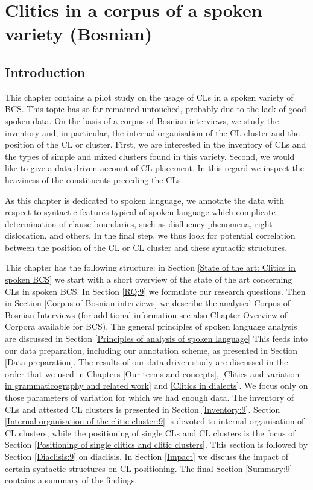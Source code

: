 \chapter[Clitics in a corpus of a spoken variety]{Clitics in a corpus of a spoken variety (Bosnian)}
\label{Clitics in a corpus of a spoken variety}
\section{Introduction}

This chapter contains a pilot study on the usage of CLs in a spoken variety of BCS. This topic has so far remained untouched, probably due to the lack of good spoken data. On the basis of a corpus of Bosnian interviews, we study the inventory and, in particular, the internal organisation of the CL cluster and the position of the CL or cluster. First, we are interested in the inventory of CLs and the types of simple and mixed clusters found in this variety. Second, we would like to give a data-driven account of CL placement. In this regard we inspect the heaviness of the constituents preceding the CLs. 

As this chapter is dedicated to spoken language, we annotate the data with respect to syntactic features typical of spoken language which complicate determination of clause boundaries, such as disfluency phenomena, right dislocation, and others. In the final step, we thus look for potential correlation between the position of the CL or CL cluster and these syntactic structures. 

This chapter has the following structure: in Section \ref{State of the art: Clitics in spoken BCS} we start with a short overview of the state of the art concerning CLs in spoken BCS. In Section \ref{RQ:9} we formulate our research questions. Then in Section \ref{Corpus of Bosnian interviews} we describe the analysed Corpus of Bosnian Interviews (for additional information see also Chapter Overview of Corpora available for BCS). The general principles of spoken language analysis are discussed in Section \ref{Principles of analysis of spoken language} This feeds into our data preparation, including our annotation scheme, as presented in Section \ref{Data preparation}. The results of our data-driven study are discussed in the order that we used in Chapters \ref{Our terms and concepts}, \ref{Clitics and variation in grammaticography and related work} and \ref{Clitics in dialects}. We focus only on those parameters of variation for which we had enough data. The inventory of CLs and attested CL clusters is presented in Section \ref{Inventory:9}. Section \ref{Internal organisation of the clitic cluster:9} is devoted to internal organisation of CL clusters, while the positioning of single CLs and CL clusters is the focus of Section \ref{Positioning of single clitics and clitic clusters}. This section is followed by Section \ref{Diaclisis:9} on diaclisis. In Section \ref{Impact} we discuss the impact of certain syntactic structures on CL positioning. The final Section \ref{Summary:9} contains a summary of the findings.

